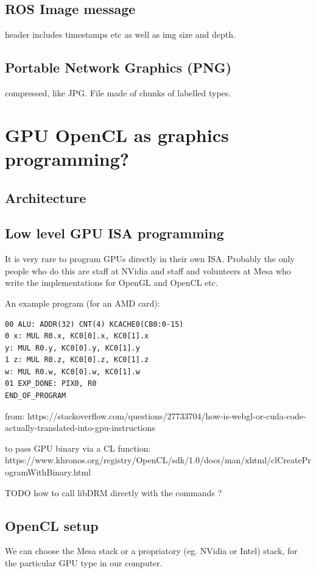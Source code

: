 \documentclass[oneside,english]{scrbook}
\begin{document}
\section{ROS Image message}

header includes timestamps etc as well as img size and depth.


\section{Portable Network Graphics (PNG)}

compressed, like JPG. File made of chunks of labelled types.



\chapter{GPU OpenCL as graphics programming?}

\section{Architecture}

\section{Low level GPU ISA programming}

It is very rare to program GPUs directly in their own ISA.  Probably the only people who do this are staff at NVidia and staff and volunteers at Mesa who write the implementations for OpenGL and OpenCL etc.

An example program (for an AMD card):

\begin{lstlisting}
00 ALU: ADDR(32) CNT(4) KCACHE0(CB0:0-15)   
0 x: MUL R0.x, KC0[0].x, KC0[1].x    
y: MUL R0.y, KC0[0].y, KC0[1].y
1 z: MUL R0.z, KC0[0].z, KC0[1].z
w: MUL R0.w, KC0[0].w, KC0[1].w
01 EXP_DONE: PIX0, R0
END_OF_PROGRAM
\end{lstlisting}

from:
https://stackoverflow.com/questions/27733704/how-is-webgl-or-cuda-code-actually-translated-into-gpu-instructions

to pass GPU binary via a CL function:
https://www.khronos.org/registry/OpenCL/sdk/1.0/docs/man/xhtml/clCreateProgramWithBinary.html

TODO how to call libDRM directly with the commands ?

\section{OpenCL setup}
We can choose the Mesa stack or a propriatory (eg. NVidia or Intel) stack, for the particular GPU type in our computer.
\end{document}
